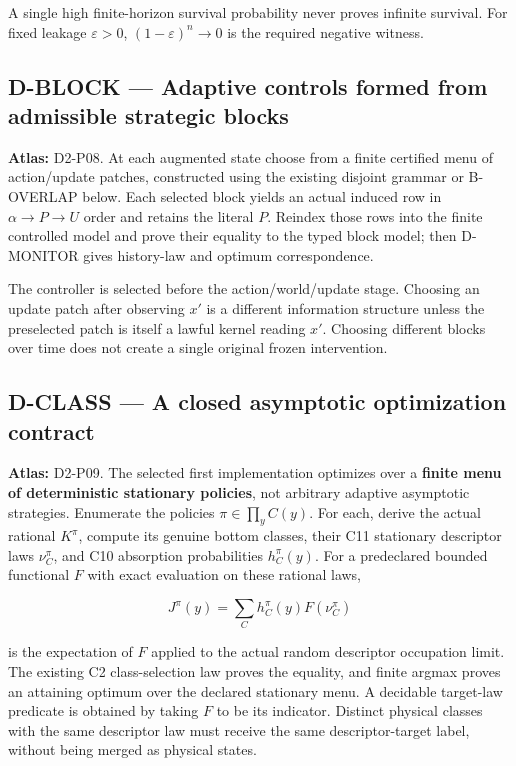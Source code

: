 \documentclass[
  11pt,
  a4paper,
]{article}
\begin{document}
A single high finite-horizon survival probability never proves infinite
survival. For fixed leakage \(\varepsilon>0\), \((1-\varepsilon)^n\to0\)
is the required negative witness.

\subsection{D-BLOCK --- Adaptive controls formed from admissible
strategic
blocks}\label{d-block-adaptive-controls-formed-from-admissible-strategic-blocks}

\textbf{Atlas:} D2-P08. At each augmented state choose from a finite
certified menu of action/update patches, constructed using the existing
disjoint grammar or B-OVERLAP below. Each selected block yields an
actual induced row in \(\alpha\to P\to U\) order and retains the literal
\(P\). Reindex those rows into the finite controlled model and prove
their equality to the typed block model; then D-MONITOR gives
history-law and optimum correspondence.

The controller is selected before the action/world/update stage.
Choosing an update patch after observing \(x'\) is a different
information structure unless the preselected patch is itself a lawful
kernel reading \(x'\). Choosing different blocks over time does not
create a single original frozen intervention.

\subsection{D-CLASS --- A closed asymptotic optimization
contract}\label{d-class-a-closed-asymptotic-optimization-contract}

\textbf{Atlas:} D2-P09. The selected first implementation optimizes over
a \textbf{finite menu of deterministic stationary policies}, not
arbitrary adaptive asymptotic strategies. Enumerate the policies
\(\pi\in\prod_yC(y)\). For each, derive the actual rational \(K^\pi\),
compute its genuine bottom classes, their C11 stationary descriptor laws
\(\nu_C^\pi\), and C10 absorption probabilities \(h_C^\pi(y)\). For a
predeclared bounded functional \(F\) with exact evaluation on these
rational laws,

\[J^\pi(y)=\sum_C h_C^\pi(y)F(\nu_C^\pi)\]

is the expectation of \(F\) applied to the actual random descriptor
occupation limit. The existing C2 class-selection law proves the
equality, and finite argmax proves an attaining optimum over the
declared stationary menu. A decidable target-law predicate is obtained
by taking \(F\) to be its indicator. Distinct physical classes with the
same descriptor law must receive the same descriptor-target label,
without being merged as physical states.
\end{document}
